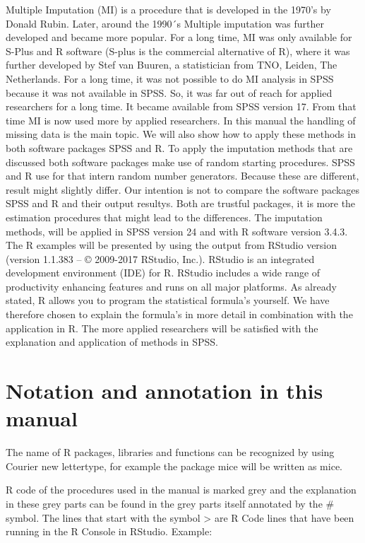 \documentclass[]{book}
\theoremstyle{definition}
\theoremstyle{definition}
\theoremstyle{definition}
\theoremstyle{remark}
\begin{document}
Multiple Imputation (MI) is a procedure that is developed in the 1970's
by Donald Rubin. Later, around the 1990´s Multiple imputation was
further developed and became more popular. For a long time, MI was only
available for S-Plus and R software (S-plus is the commercial
alternative of R), where it was further developed by Stef van Buuren, a
statistician from TNO, Leiden, The Netherlands. For a long time, it was
not possible to do MI analysis in SPSS because it was not available in
SPSS. So, it was far out of reach for applied researchers for a long
time. It became available from SPSS version 17. From that time MI is now
used more by applied researchers. In this manual the handling of missing
data is the main topic. We will also show how to apply these methods in
both software packages SPSS and R. To apply the imputation methods that
are discussed both software packages make use of random starting
procedures. SPSS and R use for that intern random number generators.
Because these are different, result might slightly differ. Our intention
is not to compare the software packages SPSS and R and their output
resultys. Both are trustful packages, it is more the estimation
procedures that might lead to the differences. The imputation methods,
will be applied in SPSS version 24 and with R software version 3.4.3.
The R examples will be presented by using the output from RStudio
version (version 1.1.383 -- © 2009-2017 RStudio, Inc.). RStudio is an
integrated development environment (IDE) for R. RStudio includes a wide
range of productivity enhancing features and runs on all major
platforms. As already stated, R allows you to program the statistical
formula's yourself. We have therefore chosen to explain the formula's in
more detail in combination with the application in R. The more applied
researchers will be satisfied with the explanation and application of
methods in SPSS.

\section{Notation and annotation in this
manual}\label{notation-and-annotation-in-this-manual}

The name of R packages, libraries and functions can be recognized by
using Courier new lettertype, for example the package mice will be
written as mice.

R code of the procedures used in the manual is marked grey and the
explanation in these grey parts can be found in the grey parts itself
annotated by the \# symbol. The lines that start with the symbol
\textgreater{} are R Code lines that have been running in the R Console
in RStudio. Example:
\end{document}
